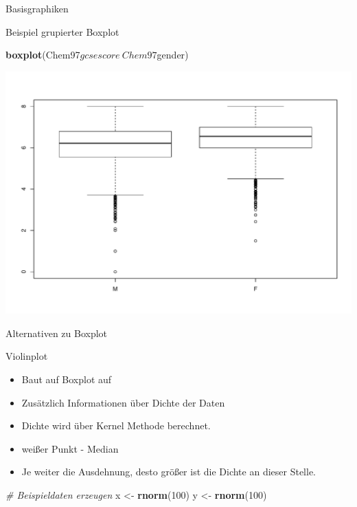 \documentclass[ignorenonframetext,]{beamer}
\newenvironment{Shaded}{}{}
\newcommand{\KeywordTok}[1]{\textcolor[rgb]{0.00,0.44,0.13}{\textbf{{#1}}}}
\newcommand{\DecValTok}[1]{\textcolor[rgb]{0.25,0.63,0.44}{{#1}}}
\newcommand{\StringTok}[1]{\textcolor[rgb]{0.25,0.44,0.63}{{#1}}}
\newcommand{\CommentTok}[1]{\textcolor[rgb]{0.38,0.63,0.69}{\textit{{#1}}}}
\newcommand{\NormalTok}[1]{{#1}}
\providecommand{\tightlist}{%
\setlength{\itemsep}{0pt}\setlength{\parskip}{0pt}}
\begin{document}
\begin{frame}[fragile]{Basisgraphiken}
\begin{block}{Beispiel grupierter Boxplot}
\begin{Shaded}
\begin{Highlighting}[]
\KeywordTok{boxplot}\NormalTok{(Chem97$gcsescore~Chem97$gender)}
\end{Highlighting}
\end{Shaded}

\includegraphics{R_intern_files/figure-beamer/unnamed-chunk-166-1.pdf}

\end{block}

\begin{block}{Alternativen zu Boxplot}

\begin{block}{Violinplot}

\begin{itemize}
\tightlist
\item
  Baut auf Boxplot auf
\item
  Zusätzlich Informationen über Dichte der Daten
\item
  Dichte wird über Kernel Methode berechnet.
\item
  weißer Punkt - Median
\item
  Je weiter die Ausdehnung, desto größer ist die Dichte an dieser
  Stelle.
\end{itemize}

\begin{Shaded}
\begin{Highlighting}[]
\CommentTok{# Beispieldaten erzeugen}
\NormalTok{x <-}\StringTok{ }\KeywordTok{rnorm}\NormalTok{(}\DecValTok{100}\NormalTok{)}
\NormalTok{y <-}\StringTok{ }\KeywordTok{rnorm}\NormalTok{(}\DecValTok{100}\NormalTok{)}
\end{Highlighting}
\end{Shaded}


\end{block}
\end{block}
\end{frame}
\end{document}
